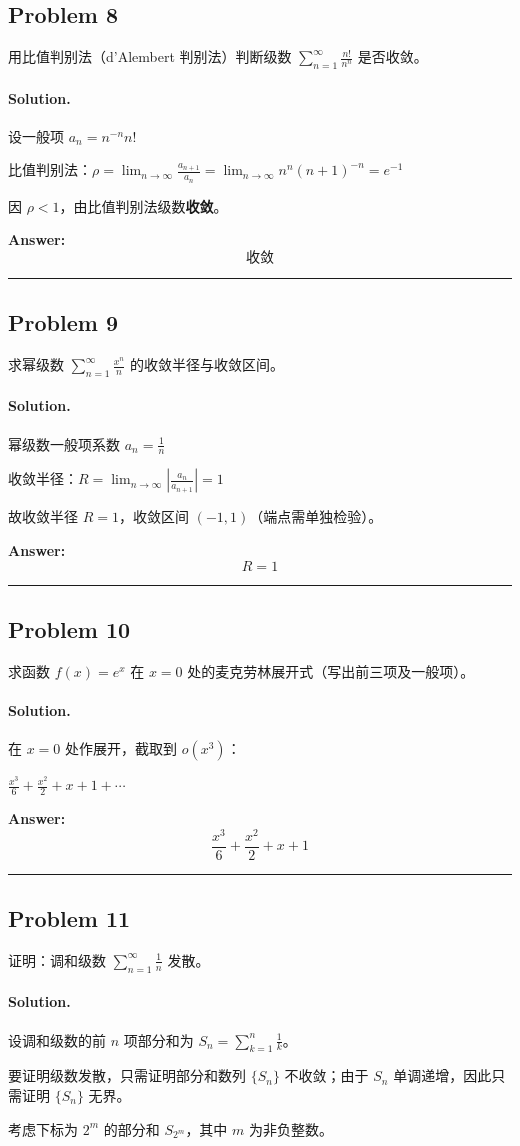 \documentclass[12pt, a4paper]{article}
\newcommand{\problem}[1]{\subsection*{Problem #1}}
\newcommand{\solution}{\paragraph{Solution.}}
\begin{document}
\problem{8}

用比值判别法（d'Alembert 判别法）判断级数 $\sum_{n=1}^{\infty} \frac{n!}{n^n}$ 是否收敛。

\solution

设一般项 $a_n=n^{- n} n!$

比值判别法：$\rho=\lim_{n\to\infty}\frac{a_{n+1}}{a_n}=\lim_{n\to\infty}n^{n} \left(n + 1\right)^{- n}=e^{-1}$

因 $\rho<1$，由比值判别法级数\textbf{收敛}。

\textbf{Answer:}
\[\boxed{收敛}\]

\vspace{1em}
\hrule
\vspace{1em}

\problem{9}

求幂级数 $\sum_{n=1}^{\infty} \frac{x^n}{n}$ 的收敛半径与收敛区间。

\solution

幂级数一般项系数 $a_n=\frac{1}{n}$

收敛半径：$R=\lim_{n\to\infty}\left|\frac{a_n}{a_{n+1}}\right|=1$

故收敛半径 $R=1$，收敛区间 $(-1,1)$（端点需单独检验）。

\textbf{Answer:}
\[\boxed{R=1}\]

\vspace{1em}
\hrule
\vspace{1em}

\problem{10}

求函数 $f(x)=e^x$ 在 $x=0$ 处的麦克劳林展开式（写出前三项及一般项）。

\solution

在 $x=0$ 处作展开，截取到 $o(x^{3})$：

$\frac{x^{3}}{6} + \frac{x^{2}}{2} + x + 1+\cdots$

\textbf{Answer:}
\[\boxed{\frac{x^{3}}{6} + \frac{x^{2}}{2} + x + 1}\]

\vspace{1em}
\hrule
\vspace{1em}

\problem{11}

证明：调和级数 $\sum_{n=1}^{\infty} \frac{1}{n}$ 发散。

\solution

设调和级数的前 $n$ 项部分和为 $S_n=\sum_{k=1}^{n}\frac{1}{k}$。

要证明级数发散，只需证明部分和数列 $\{S_n\}$ 不收敛；由于 $S_n$ 单调递增，因此只需证明 $\{S_n\}$ 无界。

考虑下标为 $2^m$ 的部分和 $S_{2^m}$，其中 $m$ 为非负整数。
\end{document}
